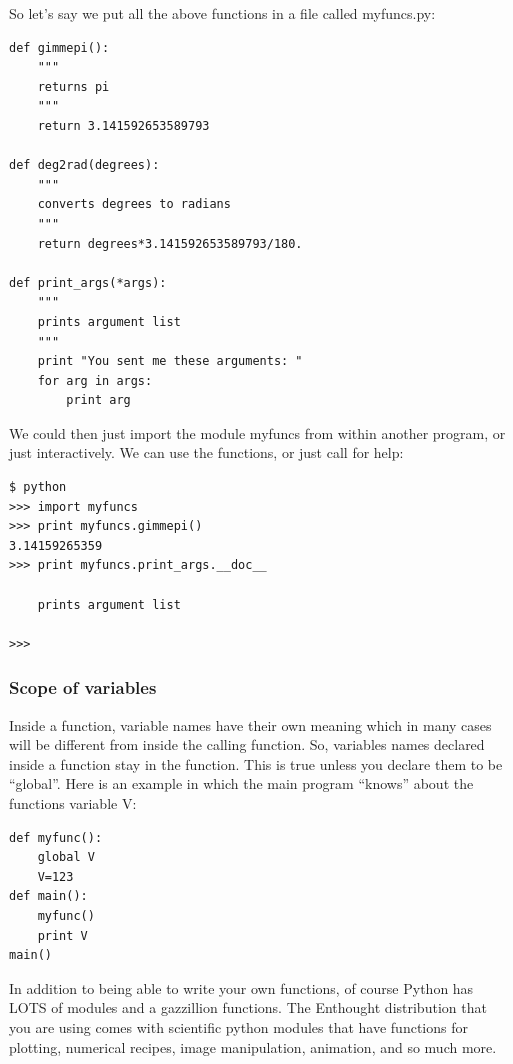 \documentclass[11pt]{book}
\begin{document}
{{{{So let's say we put all the above functions in a file called {\color{blue}myfuncs.py}:

{ \color{blue} \begin{verbatim}
def gimmepi():
    """
    returns pi
    """
    return 3.141592653589793

def deg2rad(degrees):
    """
    converts degrees to radians
    """
    return degrees*3.141592653589793/180.

def print_args(*args):
    """
    prints argument list
    """
    print "You sent me these arguments: "
    for arg in args:
        print arg
\end{verbatim}}

\noindent We could then just import the module {\color{blue}myfuncs} from within another program, or just interactively. We can use the functions, or just call for help:

{ \color{blue} \begin{verbatim}
$ python
>>> import myfuncs
>>> print myfuncs.gimmepi()
3.14159265359
>>> print myfuncs.print_args.__doc__

    prints argument list

>>>
\end{verbatim}}

\subsubsection{Scope of variables}

Inside a function,  variable names have their own meaning  which in many cases will be different from inside the calling function.  So,  variables names declared inside a function stay in the function.  This is true unless you declare them to be ``global''.
Here is an example in which the main program  ``knows'' about the functions variable {\color{blue}V}:

{ \color{blue} \begin{verbatim}
def myfunc():
    global V
    V=123
def main():
    myfunc()
    print V
main()
\end{verbatim}}







In addition to being able to write your own functions, of course
Python has LOTS of modules and a gazzillion functions. The Enthought distribution that you are using comes with scientific python modules that have functions for plotting, numerical recipes, image manipulation, animation,  and so much more.



}}}}
\end{document}
